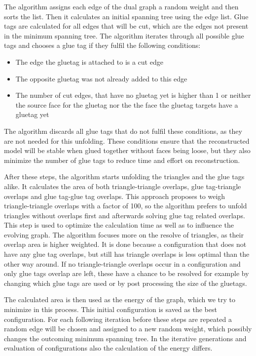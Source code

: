 \documentclass[draft,final]{vutinfth} %
\begin{document}
The algorithm assigns each edge of the dual graph a random weight and then sorts the list. Then it calculates an initial spanning tree using the edge list. Glue tags are calculated for all edges that will be cut, which are the edges not present in the minimum spanning tree. The algorithm iterates through all possible glue tags and chooses a glue tag if they fulfil the following conditions:

\begin{itemize}
	\item The edge the gluetag is attached to is a cut edge
	\item The opposite gluetag was not already added to this edge
	\item The number of cut edges, that have no gluetag yet is higher than 1 or neither the source face for the gluetag nor the the face the gluetag targets have a gluetag yet
\end{itemize}

The algorithm discards all glue tags that do not fulfil these conditions, as they are not needed for this unfolding. These conditions ensure that the reconstructed model will be stable when glued together without faces being loose, but they also minimize the number of glue tags to reduce time and effort on reconstruction.

After these steps, the algorithm starts unfolding the triangles and the glue tags alike. It calculates the area of both triangle-triangle overlaps, glue tag-triangle overlaps and glue tag-glue tag overlaps. This approach proposes to weigh triangle-triangle overlaps with a factor of 100, so the algorithm prefers to unfold triangles without overlaps first and afterwards solving glue tag related overlaps. This step is used to optimize the calculation time as well as to influence the evolving graph. The algorithm focuses more on the resolve of triangles, as their overlap area is higher weighted. It is done because a configuration that does not have any glue tag overlaps, but still has triangle overlaps is less optimal than the other way around. If no triangle-triangle overlaps occur in a configuration and only glue tags overlap are left, these have a chance to be resolved for example by changing which glue tags are used or by post processing the size of the gluetags.

The calculated area is then used as the energy of the graph, which we try to minimize in this process. This initial configuration is saved as the best configuration. For each following iteration before these steps are repeated a random edge will be chosen and assigned to a new random weight, which possibly changes the outcoming minimum spanning tree. In the iterative generations and evaluation of configurations also the calculation of the energy differs. 
\end{document}
